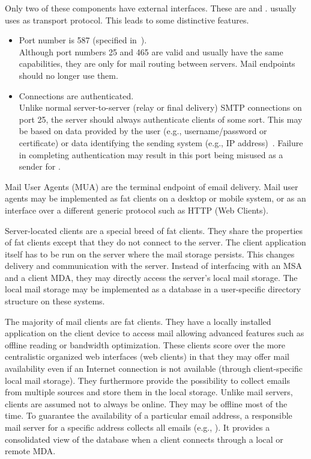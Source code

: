 Only two of these components have external interfaces. These are  and .  usually uses  as transport protocol. This leads to some distinctive features.
\begin{itemize}
	\item Port number is 587 (specified in~\cite{rfc4409}).\\
	Although port numbers 25 and 465 are valid and usually have the same capabilities, they are only for mail routing between servers. Mail endpoints should no longer use them.
	\item Connections are authenticated.\\
	Unlike normal server-to-server (relay or final delivery) SMTP connections on port 25, the server should always authenticate clients of some sort. This may be based on data provided by the user (e.g., username/password or certificate) or data identifying the sending system (e.g., IP address)~\cite{rfc4409}. Failure in completing authentication may result in this port being misused as a sender for .
\end{itemize}

Mail User Agents (MUA) are the terminal endpoint of email delivery. Mail user agents may be implemented as fat clients on a desktop or mobile system, or as an interface over a different generic protocol such as HTTP (Web Clients). 

Server-located clients are a special breed of fat clients. They share the properties of fat clients except that they do not connect to the server. The client application itself has to be run on the server where the mail storage persists. This changes delivery and communication with the server. Instead of interfacing with an MSA and a client MDA, they may directly access the server's local mail storage. The local mail storage may be implemented as a database in a user-specific directory structure on these systems.

The majority of mail clients are fat clients. They have a locally installed application on the client device to access mail allowing advanced features such as offline reading or bandwidth optimization. These clients score over the more centralistic organized web interfaces (web clients) in that they may offer mail availability even if an Internet connection is not available (through client-specific local mail storage). They furthermore provide the possibility to collect emails from multiple sources and store them in the local storage. Unlike mail servers, clients are assumed not to always be online. They may be offline most of the time. To guarantee the availability of a particular email address, a responsible mail server for a specific address collects all emails (e.g., ). It provides a consolidated view of the database when a client connects through a local or remote MDA.

